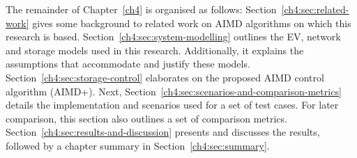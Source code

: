 The remainder of Chapter~\ref{ch4} is organised as follows:
Section~\ref{ch4:sec:related-work} gives some background to related work on AIMD algorithms on which this research is based.
Section~\ref{ch4:sec:system-modelling} outlines the EV, network and storage models used in this research.
Additionally, it explains the assumptions that accommodate and justify these models.
Section~\ref{ch4:sec:storage-control} elaborates on the proposed AIMD control algorithm (AIMD+).
Next, Section~\ref{ch4:sec:scenarios-and-comparison-metrics} details the implementation and scenarios used for a set of test cases.
For later comparison, this section also outlines a set of comparison metrics.
Section~\ref{ch4:sec:results-and-discussion} presents and discusses the results, followed by a chapter summary in Section~\ref{ch4:sec:summary}.


